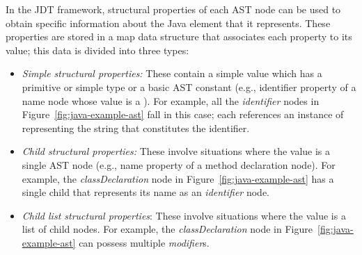 In the JDT framework, structural properties of each AST node can be used to obtain specific information about the Java element that it represents. These properties are stored in a map data structure that associates each property to its value; this data is divided into three types:

\begin{itemize} [leftmargin=0.7in]
\item \textit{Simple structural properties:} These contain a simple value which has a primitive or simple type or a basic AST constant (e.g., identifier property of a name node whose value is a ).  For example, all the \textit{identifier} nodes in Figure~\ref{fig:java-example-ast} fall in this case; each references an instance of  representing the string that constitutes the identifier.
\item \textit{Child structural properties:} These involve situations where the value is a single AST node (e.g., name property of a method declaration node).  For example, the \textit{classDeclaration} node in Figure~\ref{fig:java-example-ast} has a single child that represents its name as an \textit{identifier} node.
\item \textit{Child list structural properties}: These involve situations where the value is a list of child nodes.  For example, the \textit{classDeclaration} node in Figure~\ref{fig:java-example-ast} can possess multiple \textit{modifier}s.
\end{itemize}

